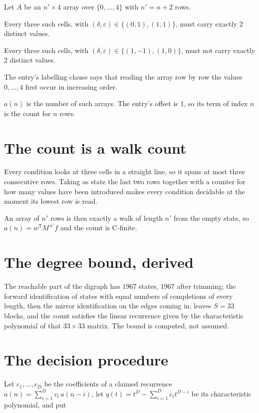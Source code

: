 \documentclass[11pt]{article}
\theoremstyle{definition}
\begin{document}
Let $A$ be an $n' \times 4$ array over $\{0,\dots,4\}$ with $n' = n + 2$ rows.

Every three such cells, with $(\delta,\varepsilon) \in \{(0,1), (1,1)\}$, must carry exactly $2$ distinct values.

Every three such cells, with $(\delta,\varepsilon) \in \{(1,-1), (1,0)\}$, must not carry exactly $2$ distinct values.

The entry's labelling clause says that reading the array row by row the values $0,\dots,4$ first occur in increasing order.

$a(n)$ is the number of such arrays. The entry's offset is 1, so its term of index $n$ is the count for $n$ rows.

\section{The count is a walk count}

Every condition looks at three cells in a straight line, so it spans at most three consecutive rows. Taking as state the last two rows together with a counter for how many values have been introduced makes every condition decidable at the moment its lowest row is read.

An array of $n'$ rows is then exactly a walk of length $n'$ from the empty state, so $a(n) = w^{\mathsf T}M^{\,n'}f$ and the count is C-finite.

\section{The degree bound, derived}

The reachable part of the digraph has $1967$ states, $1967$ after trimming; the forward identification of states with equal numbers of completions of every length, then the mirror identification on the edges coming in, leaves $S = 33$ blocks, and the count satisfies the linear recurrence given by the characteristic polynomial of that $33\times33$ matrix. The bound is computed, not assumed.

\section{The decision procedure}

Let $c_1,\dots,c_D$ be the coefficients of a claimed recurrence $a(n) = \sum_{i=1}^{D} c_i\,a(n-i)$, let $q(t) = t^{D} - \sum_{i=1}^{D} c_i t^{D-i}$ be its characteristic polynomial, and put
\end{document}
